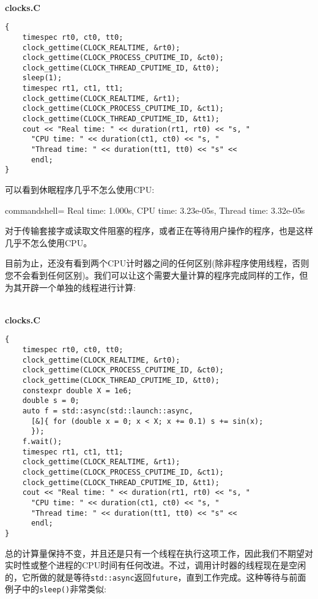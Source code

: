 \hspace*{\fill} \\ %
\noindent
\textbf{clocks.C}
\begin{lstlisting}[style=styleCXX]
{
	timespec rt0, ct0, tt0;
	clock_gettime(CLOCK_REALTIME, &rt0);
	clock_gettime(CLOCK_PROCESS_CPUTIME_ID, &ct0);
	clock_gettime(CLOCK_THREAD_CPUTIME_ID, &tt0);
	sleep(1);
	timespec rt1, ct1, tt1;
	clock_gettime(CLOCK_REALTIME, &rt1);
	clock_gettime(CLOCK_PROCESS_CPUTIME_ID, &ct1);
	clock_gettime(CLOCK_THREAD_CPUTIME_ID, &tt1);
	cout << "Real time: " << duration(rt1, rt0) << "s, "
	  "CPU time: " << duration(ct1, ct0) << "s, "
	  "Thread time: " << duration(tt1, tt0) << "s" <<
  	  endl;
}
\end{lstlisting}

可以看到休眠程序几乎不怎么使用CPU:

\begin{tcblisting}{commandshell={}}
Real time: 1.000s, CPU time: 3.23e-05s, Thread time: 3.32e-05s
\end{tcblisting}

对于传输套接字或读取文件阻塞的程序，或者正在等待用户操作的程序，也是这样几乎不怎么使用CPU。

目前为止，还没有看到两个CPU计时器之间的任何区别(除非程序使用线程，否则您不会看到任何区别)。我们可以让这个需要大量计算的程序完成同样的工作，但为其开辟一个单独的线程进行计算:

\hspace*{\fill} \\ %
\noindent
\textbf{clocks.C}
\begin{lstlisting}[style=styleCXX]
{
	timespec rt0, ct0, tt0;
	clock_gettime(CLOCK_REALTIME, &rt0);
	clock_gettime(CLOCK_PROCESS_CPUTIME_ID, &ct0);
	clock_gettime(CLOCK_THREAD_CPUTIME_ID, &tt0);
	constexpr double X = 1e6;
	double s = 0;
	auto f = std::async(std::launch::async,
	  [&]{ for (double x = 0; x < X; x += 0.1) s += sin(x);
	  });
	f.wait();
	timespec rt1, ct1, tt1;
	clock_gettime(CLOCK_REALTIME, &rt1);
	clock_gettime(CLOCK_PROCESS_CPUTIME_ID, &ct1);
	clock_gettime(CLOCK_THREAD_CPUTIME_ID, &tt1);
	cout << "Real time: " << duration(rt1, rt0) << "s, "
	  "CPU time: " << duration(ct1, ct0) << "s, "
	  "Thread time: " << duration(tt1, tt0) << "s" <<
	  endl;
}
\end{lstlisting}

总的计算量保持不变，并且还是只有一个线程在执行这项工作，因此我们不期望对实时性或整个进程的CPU时间有任何改进。不过，调用计时器的线程现在是空闲的，它所做的就是等待\texttt{std::async}返回\texttt{future}，直到工作完成。这种等待与前面例子中的\texttt{sleep()}非常类似:

